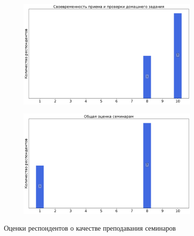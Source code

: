 \begin{figure}[H]
\begin{subfigure}[b]{0.45\textwidth}
				\includegraphics[width=\textwidth]{images/2 course/Общая физика - электричество и магнетизм/seminarists-marks-Рыбакова А.К.-2.png}
			\end{subfigure}
			\begin{subfigure}[b]{0.45\textwidth}
				\centering
				\includegraphics[width=\textwidth]{images/2 course/Общая физика - электричество и магнетизм/seminarists-marks-Рыбакова А.К.-3.png}
			\end{subfigure}	
			\caption{Оценки респондентов о качестве преподавания семинаров}
		\end{figure}


